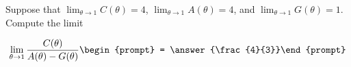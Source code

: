\documentclass{ximera}
\author{Matthew Carr}
\begin{document}
\begin{exercise}
Suppose that $\lim_{\theta\to1}C(\theta)=4$, $\lim_{\theta\to1}A(\theta)=4$, and $\lim_{\theta\to1}G(\theta)=1$. Compute the limit

\[
\lim_{\theta\to 1 } \frac{C(\theta)}{A(\theta)-G(\theta)}\begin{prompt} = \answer{\frac{4}{3}}\end{prompt}
\]
\end{exercise}
\end{document}

